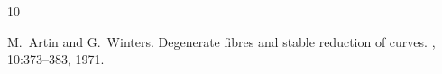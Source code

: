 \documentclass[10pt,a4paper]{amsart}
\theoremstyle{plain}
\theoremstyle{definition}
\theoremstyle{remark}
\numberwithin{equation}{subsection}
\begin{document}
\begin{thebibliography}{10}

M.~Artin and G.~Winters.
\newblock Degenerate fibres and stable reduction of curves.
, 10:373--383, 1971.

\end{thebibliography}
\end{document}
